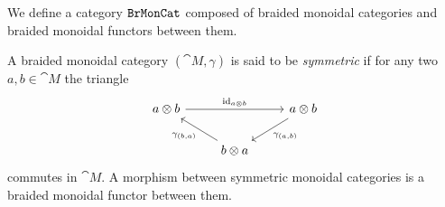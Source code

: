 \documentclass[../../deep-dive]{subfiles}
\begin{document}
\begin{definition}
    \label{def:category-of-braided-monoidal}
    We define a category \({\texttt{BrMonCat}}\) composed of braided monoidal categories and
    braided monoidal functors between them.
\end{definition}

\begin{definition}
    \label{def:symmetric-monoidal-category}
    A braided monoidal category \((\cat M, \gamma)\) is said to be \emph{symmetric}
    if for any two \(a, b \in \cat M\) the triangle
    \[
        \begin{tikzcd}
            a \otimes b \ar[rr, "\Id_{a \otimes b}"]
            & &a \otimes b \ar[ld, "\gamma_{(a, b)}"] \\
            &b \otimes a \ar[lu, "\gamma_{(b, a)}"] &
        \end{tikzcd}
    \]
    commutes in \(\cat M\). A morphism between symmetric monoidal categories is a
    braided monoidal functor between them.
\end{definition}
\end{document}
